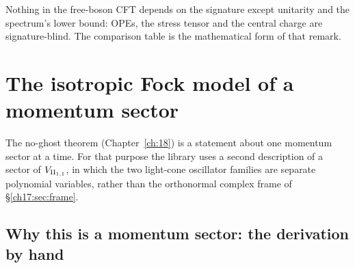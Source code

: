 \begin{physics}
Nothing in the free-boson CFT depends on the signature except unitarity and the spectrum's lower bound:
OPEs, the stress tensor and the central charge are signature-blind.  The comparison table is the
mathematical form of that remark.
\end{physics}

\section{The isotropic Fock model of a momentum sector}\label{ch17:sec:hyp}

The no-ghost theorem (Chapter~\ref{ch:18}) is a statement about one momentum sector at a time.  For that
purpose the library uses a second description of a sector of ${V_{\mathrm{II}_{1,1}}}$, in which the two
light-cone oscillator families are separate polynomial variables, rather than the orthonormal complex
frame of \S\ref{ch17:sec:frame}.

\subsection{Why this is a momentum sector: the derivation by hand}\label{ch17:sec:hypwhy}

